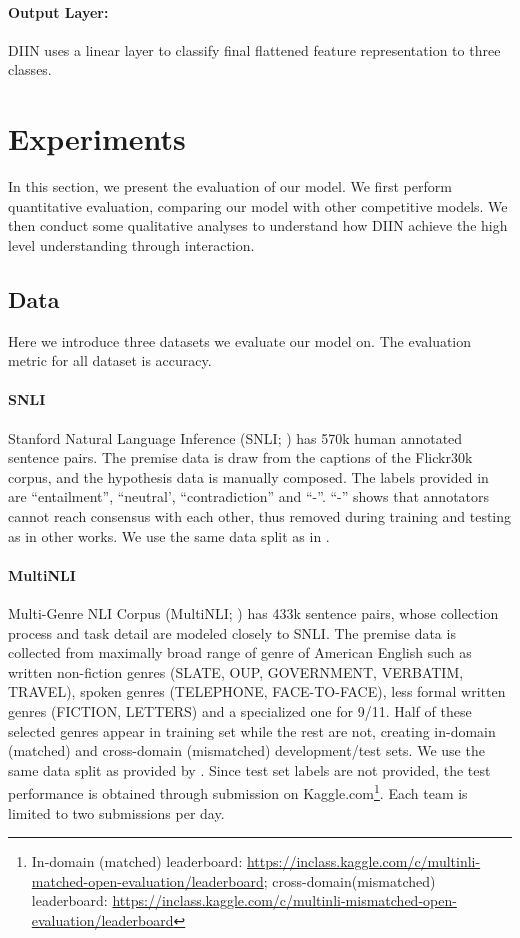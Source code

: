 \documentclass{article} \usepackage{iclr2018_conference,times}
\begin{document}
\paragraph{Output Layer: } DIIN uses a linear layer to classify final flattened feature representation to three classes.

\section{Experiments}
In this section, we present the evaluation of our model. We first perform quantitative evaluation, comparing our model with other competitive models. We then conduct some qualitative analyses to understand how DIIN achieve the high level understanding through interaction.

\subsection{Data}
Here we introduce three datasets we evaluate our model on. The evaluation metric for all dataset is accuracy.
\paragraph{SNLI}  Stanford Natural Language Inference (SNLI; \citealt{snli_2015arXiv150805326B}) has 570k human annotated sentence pairs. The premise data is draw from the captions of the Flickr30k corpus, and the hypothesis data is manually composed. The labels provided in are ``entailment'', ``neutral', ``contradiction'' and ``-''. ``-'' shows that annotators cannot reach consensus with each other, thus removed during training and testing as in other works. We use the same data split as in \cite{snli_2015arXiv150805326B}.
\paragraph{MultiNLI}  Multi-Genre NLI Corpus (MultiNLI; \citealt{MultiNLI_Williams:2017tk}) has 433k sentence pairs, whose collection process and task detail are modeled closely to SNLI. The premise data is collected from maximally broad range of genre of American English such as written non-fiction genres (SLATE, OUP, GOVERNMENT, VERBATIM, TRAVEL), spoken genres (TELEPHONE, FACE-TO-FACE), less formal written genres (FICTION, LETTERS) and a specialized one for 9/11. Half of these selected genres appear in training set while the rest are not, creating in-domain (matched) and cross-domain (mismatched) development/test sets. We use the same data split as provided by \citet{MultiNLI_Williams:2017tk}. Since test set labels are not provided, the test performance is obtained through submission on Kaggle.com\footnote{In-domain (matched) leaderboard: \url{https://inclass.kaggle.com/c/multinli-matched-open-evaluation/leaderboard}; cross-domain(mismatched) leaderboard: \url{https://inclass.kaggle.com/c/multinli-mismatched-open-evaluation/leaderboard}}. Each team is limited to two submissions per day.
\end{document}
